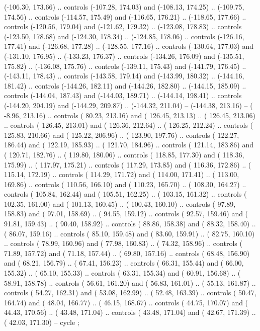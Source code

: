 {        (-106.30, 173.66) .. controls (-107.28, 174.03) and (-108.13, 174.25) ..
        (-109.75, 174.56) .. controls (-114.57, 175.49) and (-116.65, 176.21) ..
        (-118.65, 177.66) .. controls (-120.56, 179.04) and (-121.62, 179.32) ..
        (-123.08, 178.83) .. controls (-123.50, 178.68) and (-124.30, 178.34) ..
        (-124.85, 178.06) .. controls (-126.16, 177.41) and (-126.68, 177.28) ..
        (-128.55, 177.16) .. controls (-130.64, 177.03) and (-131.10, 176.95) ..
        (-133.23, 176.37) .. controls (-134.26, 176.09) and (-135.51, 175.82) ..
        (-136.08, 175.76) .. controls (-139.11, 175.43) and (-141.79, 176.45) ..
        (-143.11, 178.43) .. controls (-143.58, 179.14) and (-143.99, 180.32) ..
        (-144.16, 181.42) .. controls (-144.26, 182.11) and (-144.26, 182.80) ..
        (-144.15, 185.09) .. controls (-144.04, 187.43) and (-144.03, 189.71) ..
        (-144.14, 198.41) .. controls (-144.20, 204.19) and (-144.29, 209.87) ..
        (-144.32, 211.04) -- 
        (-144.38, 213.16) -- 
        (  -8.96, 213.16) .. controls (  80.23, 213.16) and ( 126.45, 213.13) ..
        ( 126.45, 213.06) .. controls ( 126.45, 213.01) and ( 126.36, 212.64) ..
        ( 126.25, 212.24) .. controls ( 125.83, 210.66) and ( 125.22, 206.96) ..
        ( 123.90, 197.76) .. controls ( 122.27, 186.44) and ( 122.19, 185.93) ..
        ( 121.70, 184.96) .. controls ( 121.14, 183.86) and ( 120.71, 182.76) ..
        ( 119.80, 180.06) .. controls ( 118.85, 177.30) and ( 118.36, 175.99) ..
        ( 117.97, 175.21) .. controls ( 117.29, 173.85) and ( 116.36, 172.86) ..
        ( 115.14, 172.19) .. controls ( 114.29, 171.72) and ( 114.00, 171.41) ..
        ( 113.00, 169.86) .. controls ( 110.56, 166.10) and ( 110.23, 165.70) ..
        ( 108.30, 164.27) .. controls ( 105.84, 162.44) and ( 105.51, 162.25) ..
        ( 103.15, 161.32) .. controls ( 102.35, 161.00) and ( 101.13, 160.45) ..
        ( 100.43, 160.10) .. controls (  97.89, 158.83) and (  97.01, 158.69) ..
        (  94.55, 159.12) .. controls (  92.57, 159.46) and (  91.81, 159.43) ..
        (  90.40, 158.92) .. controls (  88.86, 158.38) and (  88.32, 158.40) ..
        (  86.07, 159.16) .. controls (  85.10, 159.48) and (  83.60, 159.91) ..
        (  82.75, 160.10) .. controls (  78.99, 160.96) and (  77.98, 160.83) ..
        (  74.32, 158.96) .. controls (  71.89, 157.72) and (  71.18, 157.44) ..
        (  69.80, 157.16) .. controls (  68.48, 156.90) and (  68.21, 156.79) ..
        (  67.41, 156.23) .. controls (  66.31, 155.44) and (  66.00, 155.32) ..
        (  65.10, 155.33) .. controls (  63.31, 155.34) and (  60.91, 156.68) ..
        (  58.91, 158.78) .. controls (  56.61, 161.20) and (  56.83, 161.01) ..
        (  55.13, 161.87) .. controls (  54.27, 162.31) and (  53.08, 162.99) ..
        (  52.48, 163.39) .. controls (  50.47, 164.74) and (  48.04, 166.77) ..
        (  46.15, 168.67) .. controls (  44.75, 170.07) and (  44.43, 170.56) ..
        (  43.48, 171.04) .. controls (  43.48, 171.04) and (  42.67, 171.39) ..
        (  42.03, 171.30) -- 
        cycle ;
}

